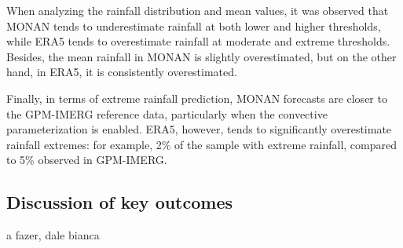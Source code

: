 When analyzing the rainfall distribution and mean values, it was observed that MONAN tends to underestimate rainfall at both lower and higher thresholds, while ERA5 tends to overestimate rainfall at moderate and extreme thresholds. Besides, the mean rainfall in MONAN is slightly overestimated, but on the other hand, in ERA5, it is consistently overestimated.

Finally, in terms of extreme rainfall prediction, MONAN forecasts are closer to the GPM-IMERG reference data, particularly when the convective parameterization is enabled. ERA5, however, tends to significantly overestimate rainfall extremes: for example, 2\% of the sample with extreme rainfall, compared to 5\% observed in GPM-IMERG.

\subsection{Discussion of key outcomes}

a fazer, dale bianca